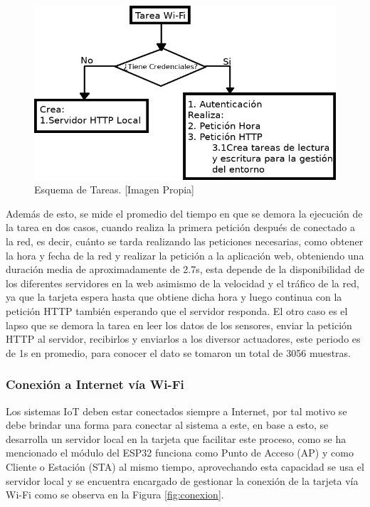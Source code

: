 \begin{figure}[H]
	\centering
	\caption[Esquema de Tareas.]{Esquema de Tareas. [Imagen Propia]}
	\label{fig:tareas}
	\includegraphics[width=0.7\linewidth]{Imagenes/tareas}
\end{figure}

Además de esto, se mide el promedio del tiempo en que se demora la ejecución de la tarea en dos casos, cuando realiza la primera petición después de conectado a la red, es decir, cuánto se tarda realizando las peticiones necesarias, como obtener la hora y fecha de la red y realizar la petición a la aplicación web, obteniendo una duración media de aproximadamente de 2.7s, esta depende de la disponibilidad de los diferentes servidores en la web asimismo de la velocidad y el tráfico de la red, ya que la tarjeta espera hasta que obtiene dicha hora y luego continua con la petición HTTP también esperando que el servidor responda. El otro caso es el lapso que se demora la tarea en leer los datos de los sensores, enviar la petición HTTP al servidor, recibirlos y enviarlos a los diversor actuadores, este periodo es de 1s en promedio, para conocer el dato se tomaron un total de 3056 muestras.

\subsubsection{Conexión a Internet vía Wi-Fi}\label{sub:wifi}

Los sistemas IoT deben estar conectados siempre a Internet, por tal motivo se debe brindar una forma para conectar al sistema a este, en base a esto, se desarrolla un servidor local en la tarjeta que facilitar este proceso, como se ha mencionado el módulo del ESP32 funciona como Punto de Acceso (AP) y como Cliente o Estación (STA) al mismo tiempo, aprovechando esta capacidad se usa el servidor local y se encuentra encargado de gestionar la conexión de la tarjeta vía Wi-Fi como se observa en la Figura \ref{fig:conexion}.\\

